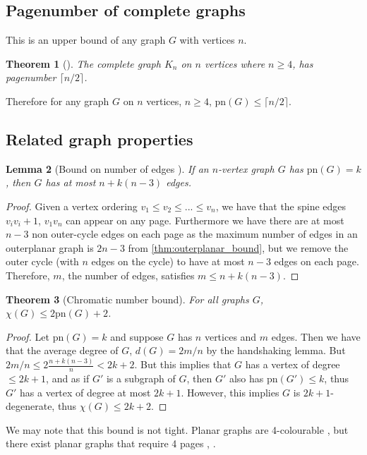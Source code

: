 \documentclass[]{report}
\newcommand{\pn}{\text{pn}}
\newtheorem{theorem}{Theorem}
\newtheorem{lemma}[theorem]{Lemma}
\theoremstyle{definition}
\numberwithin{theorem}{section}
\numberwithin{equation}{section}
\begin{document}
\subsection{Pagenumber of complete graphs}\label{ssec:Pagenumber_Complete_Graphs}
This is an upper bound of any graph $G$ with vertices $n$. 
\begin{theorem}[\cite{bernhartBookThicknessGraph1979}]\label{thm:Pagenumber_Complete_Graph}
	The complete graph $K_n$ on $n$ vertices where $n \geq 4$, has pagenumber $\lceil n/2 \rceil$. 
\end{theorem}
 Therefore for any graph $G$ on $n$ vertices, $n \geq 4$, $\pn(G) \leq \lceil n/2 \rceil$. 
\subsection{Related graph properties}\label{ssec:Related_Properties}

\begin{lemma}[Bound on number of edges \cite{bernhartBookThicknessGraph1979}]\label{lem:Edge_Bound}
	If an $n$-vertex graph $G$ has $\pn(G) = k$, then $G$ has at most $n + k(n-3)$ edges.
\end{lemma}
\begin{proof}
	Given a vertex ordering $v_1 \leq v_2 \leq ... \leq v_n$, we have that the spine edges $v_i v_i+1$, $v_1 v_n$  can appear on any page. Furthermore we have there are at most $n-3$ non outer-cycle edges on each page as the maximum number of edges in an outerplanar graph is $2n - 3$ from \cref{thm:outerplanar_bound}, but we remove the outer cycle (with $n$ edges on the cycle) to have at most $n-3$ edges on each page. Therefore, $m$, the number of edges, satisfies $m \leq n + k (n - 3)$. 
\end{proof}
\begin{theorem}[Chromatic number bound\cite{bernhartBookThicknessGraph1979}]\label{thm:Colouring_Bound}
	For all graphs $G$, $\chi(G) \leq 2 \pn(G) + 2$.
\end{theorem}
\begin{proof}
	Let $\pn(G) = k$ and suppose $G$ has $n$ vertices and $m$ edges. Then we have that the average degree of $G$, $d(G) = 2m/n$ by the handshaking lemma. But $2m/n \leq 2 \frac{n + k(n-3)}{n} < 2k + 2$. But this implies that $G$ has a vertex of degree $\leq 2k + 1$, and as if $G'$ is a subgraph of $G$, then $G'$ also has $\pn(G') \leq k$, thus $G'$ has a vertex of degree at most $2k + 1$. However, this implies $G$ is $2k + 1$-degenerate, thus $\chi(G) \leq 2k + 2$. 
\end{proof}
We may note that this bound is not tight. Planar graphs are 4-colourable \cite{appelEveryPlanarMap1989}, but there exist planar graphs that require 4 pages \cite{yannakakisPlanarGraphsThat2020}, \cite{kaufmannFourPagesAre2020}. 
\end{document}
